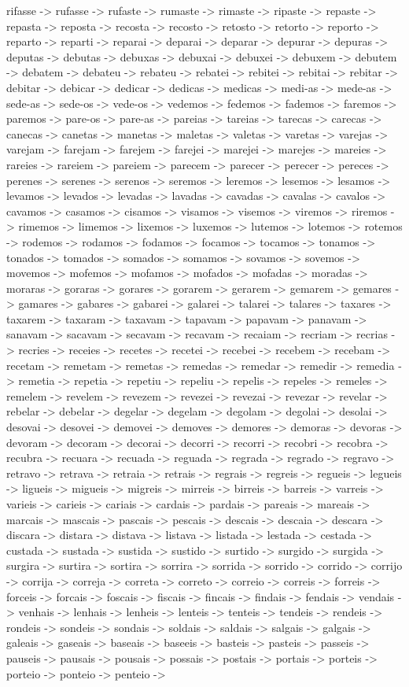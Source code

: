 \documentclass[a4paper,11pt]{article}
\begin{document}
rifasse -> rufasse -> rufaste -> rumaste -> rimaste -> ripaste -> repaste -> repasta -> reposta -> recosta -> recosto -> retosto -> retorto -> reporto -> reparto -> reparti -> reparai -> deparai -> deparar -> depurar -> depuras -> deputas -> debutas -> debuxas -> debuxai -> debuxei -> debuxem -> debutem -> debatem -> debateu -> rebateu -> rebatei -> rebitei -> rebitai -> rebitar -> debitar -> debicar -> dedicar -> dedicas -> medicas -> medi-as -> mede-as -> sede-as -> sede-os -> vede-os -> vedemos -> fedemos -> fademos -> faremos -> paremos -> pare-os -> pare-as -> pareias -> tareias -> tarecas -> carecas -> canecas -> canetas -> manetas -> maletas -> valetas -> varetas -> varejas -> varejam -> farejam -> farejem -> farejei -> marejei -> marejes -> mareies -> rareies -> rareiem -> pareiem -> parecem -> parecer -> perecer -> pereces -> perenes -> serenes -> serenos -> seremos -> leremos -> lesemos -> lesamos -> levamos -> levados -> levadas -> lavadas -> cavadas -> cavalas -> cavalos -> cavamos -> casamos -> cisamos -> visamos -> visemos -> viremos -> riremos -> rimemos -> limemos -> lixemos -> luxemos -> lutemos -> lotemos -> rotemos -> rodemos -> rodamos -> fodamos -> focamos -> tocamos -> tonamos -> tonados -> tomados -> somados -> somamos -> sovamos -> sovemos -> movemos -> mofemos -> mofamos -> mofados -> mofadas -> moradas -> moraras -> goraras -> gorares -> gorarem -> gerarem -> gemarem -> gemares -> gamares -> gabares -> gabarei -> galarei -> talarei -> talares -> taxares -> taxarem -> taxaram -> taxavam -> tapavam -> papavam -> panavam -> sanavam -> sacavam -> secavam -> recavam -> recaiam -> recriam -> recrias -> recries -> receies -> recetes -> recetei -> recebei -> recebem -> recebam -> recetam -> remetam -> remetas -> remedas -> remedar -> remedir -> remedia -> remetia -> repetia -> repetiu -> repeliu -> repelis -> repeles -> remeles -> remelem -> revelem -> revezem -> revezei -> revezai -> revezar -> revelar -> rebelar -> debelar -> degelar -> degelam -> degolam -> degolai -> desolai -> desovai -> desovei -> demovei -> demoves -> demores -> demoras -> devoras -> devoram -> decoram -> decorai -> decorri -> recorri -> recobri -> recobra -> recubra -> recuara -> recuada -> reguada -> regrada -> regrado -> regravo -> retravo -> retrava -> retraia -> retrais -> regrais -> regreis -> regueis -> legueis -> ligueis -> migueis -> migreis -> mirreis -> birreis -> barreis -> varreis -> varieis -> carieis -> cariais -> cardais -> pardais -> pareais -> mareais -> marcais -> mascais -> pascais -> pescais -> descais -> descaia -> descara -> discara -> distara -> distava -> listava -> listada -> lestada -> cestada -> custada -> sustada -> sustida -> sustido -> surtido -> surgido -> surgida -> surgira -> surtira -> sortira -> sorrira -> sorrida -> sorrido -> corrido -> corrijo -> corrija -> correja -> correta -> correto -> correio -> correis -> forreis -> forceis -> forcais -> foscais -> fiscais -> fincais -> findais -> fendais -> vendais -> venhais -> lenhais -> lenheis -> lenteis -> tenteis -> tendeis -> rendeis -> rondeis -> sondeis -> sondais -> soldais -> saldais -> salgais -> galgais -> galeais -> gaseais -> baseais -> baseeis -> basteis -> pasteis -> passeis -> pauseis -> pausais -> pousais -> possais -> postais -> portais -> porteis -> porteio -> ponteio -> penteio -> 
\end{document}
